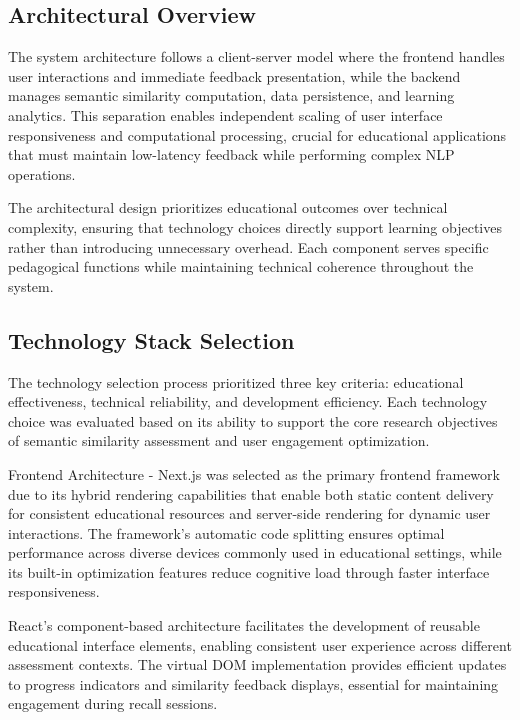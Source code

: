 {\subsection{Architectural Overview}

The system architecture follows a client-server model where the frontend handles user interactions and immediate feedback presentation, while the backend manages semantic similarity computation, data persistence, and learning analytics. This separation enables independent scaling of user interface responsiveness and computational processing, crucial for educational applications that must maintain low-latency feedback while performing complex NLP operations.

The architectural design prioritizes educational outcomes over technical complexity, ensuring that technology choices directly support learning objectives rather than introducing unnecessary overhead. Each component serves specific pedagogical functions while maintaining technical coherence throughout the system.

\subsection{Technology Stack Selection}

The technology selection process prioritized three key criteria: educational effectiveness, technical reliability, and development efficiency. Each technology choice was evaluated based on its ability to support the core research objectives of semantic similarity assessment and user engagement optimization.

Frontend Architecture - Next.js was selected as the primary frontend framework due to its hybrid rendering capabilities that enable both static content delivery for consistent educational resources and server-side rendering for dynamic user interactions. The framework's automatic code splitting ensures optimal performance across diverse devices commonly used in educational settings, while its built-in optimization features reduce cognitive load through faster interface responsiveness.

React's component-based architecture facilitates the development of reusable educational interface elements, enabling consistent user experience across different assessment contexts. The virtual DOM implementation provides efficient updates to progress indicators and similarity feedback displays, essential for maintaining engagement during recall sessions.

}

